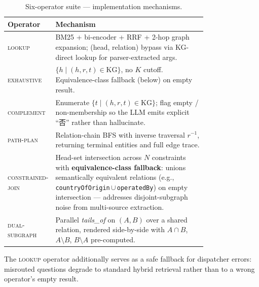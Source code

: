 \documentclass[11pt,a4paper]{article}
\newcommand{\op}[1]{\textsc{\small #1}}
\begin{document}
\begin{table}[t]
\centering
\small
\caption{Six-operator suite --- implementation mechanisms.}
\label{tab:operators}
\begin{tabular}{l p{0.78\linewidth}}
\toprule
\textbf{Operator} & \textbf{Mechanism} \\
\midrule
\op{lookup}            & BM25 + bi-encoder + RRF + 2-hop graph expansion; (head, relation) bypass via KG-direct lookup for parser-extracted args. \\
\op{exhaustive}        & $\{h \mid (h, r, t) \in \text{KG}\}$, no $K$ cutoff. Equivalence-class fallback (below) on empty result. \\
\op{complement}        & Enumerate $\{t \mid (h, r, t) \in \text{KG}\}$; flag empty / non-membership so the LLM emits explicit ``否'' rather than hallucinate. \\
\op{path-plan}         & Relation-chain BFS with inverse traversal $r^{-1}$, returning terminal entities and full edge trace. \\
\op{constrained-join}  & Head-set intersection across $N$ constraints with \textbf{equivalence-class fallback}: unions semantically equivalent relations (e.g., \texttt{countryOfOrigin}\,$\cup$\,\texttt{operatedBy}) on empty intersection --- addresses disjoint-subgraph noise from multi-source extraction. \\
\op{dual-subgraph}     & Parallel \textit{tails\_of} on $(A,B)$ over a shared relation, rendered side-by-side with $A\!\cap\!B$, $A{\setminus}B$, $B{\setminus}A$ pre-computed. \\
\bottomrule
\end{tabular}
\end{table}

The \op{lookup} operator additionally serves as a safe fallback for dispatcher errors: misrouted questions degrade to standard hybrid retrieval rather than to a wrong operator's empty result.
\end{document}
